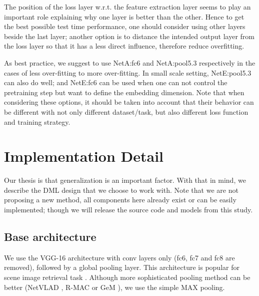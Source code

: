 \documentclass[10pt,twocolumn,letterpaper]{article}
\begin{document}

The position of the loss layer w.r.t. the feature extraction layer seems to play an important role explaining why one layer is better than the other. Hence to get the best possible test time performance, one should consider using other layers beside the last layer; another option is to distance the intended output layer from the loss layer so that it has a less direct influence, therefore reduce overfitting.

As best practice, we suggest to use NetA:fc6 and NetA:pool5.3 respectively in the cases of less over-fitting to more over-fitting. In small scale setting, NetE:pool5.3 can also do well; and NetE:fc6 can be used when one can not control the pretraining step but want to define the embedding dimension. Note that when considering these options, it should be taken into account that their behavior can be different with not only different dataset/task, but also different loss function and training strategy.



\section{Implementation Detail}


Our thesis is that generalization is an important factor. With that in mind, we describe the DML design that we choose to work with. Note that we are not proposing a new method, all components here already exist or can be easily implemented; though we will release the source code and models from this study. 

\subsection{Base architecture}

We use the VGG-16 architecture with conv layers only (fc6, fc7 and fc8 are removed), followed by a global pooling layer. This architecture is popular for scene image retrieval task \cite{arandjelovic2016netvlad,tolias2015particular,radenovic2016cnn,gordo2016deep}. Although more sophisticated pooling method can be better (NetVLAD \cite{arandjelovic2016netvlad}, R-MAC \cite{tolias2015particular} or GeM \cite{radenovic2017fine}), we use the simple MAX pooling.
\end{document}
